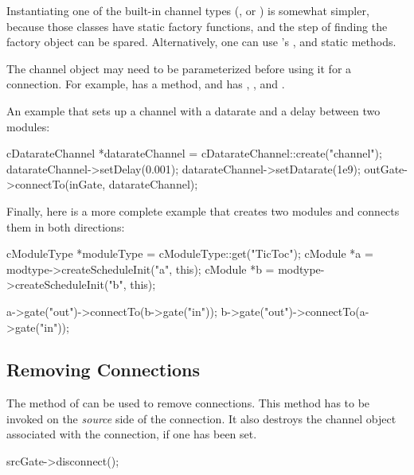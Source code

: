 Instantiating one of the built-in channel types (,
 or ) is somewhat simpler,
because those classes have static  factory functions, and the
step of finding the factory object can be spared. Alternatively, one can use
's , 
and  static methods.

The channel object may need to be parameterized before using it for a
connection. For example,  has a 
method, and  has ,
,  and
.

An example that sets up a channel with a datarate and a delay between two
modules:

\begin{cpp}
cDatarateChannel *datarateChannel = cDatarateChannel::create("channel");
datarateChannel->setDelay(0.001);
datarateChannel->setDatarate(1e9);
outGate->connectTo(inGate, datarateChannel);
\end{cpp}

Finally, here is a more complete example that creates two modules and
connects them in both directions:

\begin{cpp}
cModuleType *moduleType = cModuleType::get("TicToc");
cModule *a = modtype->createScheduleInit("a", this);
cModule *b = modtype->createScheduleInit("b", this);

a->gate("out")->connectTo(b->gate("in"));
b->gate("out")->connectTo(a->gate("in"));
\end{cpp}


\subsection{Removing Connections}
\label{sec:simple-modules:removing-connections}

The  method of  can be
used to remove connections. This method has to be invoked
on the \textit{source} side of the connection. It also destroys
the channel object associated with the connection, if one has been set.

\begin{cpp}
srcGate->disconnect();
\end{cpp}



